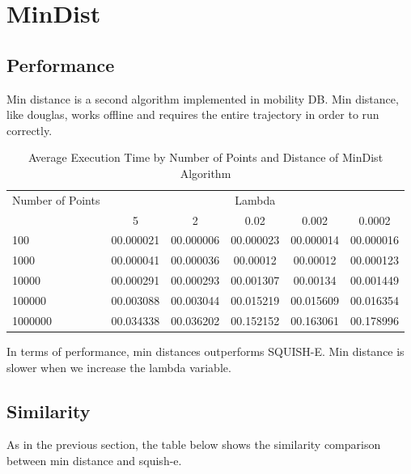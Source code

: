 \section{MinDist}
\subsection{Performance}
Min distance is a second algorithm implemented in mobility DB. Min distance, like douglas, works offline and requires the entire trajectory in order to run correctly. %
\begin{table}[htbp]
    \centering
    \label{tab:execution_time_mindist}
    \begin{tabular}{@{}lccccc@{}}
        \toprule
        Number of Points & \multicolumn{5}{c}{Lambda} \\
        \cmidrule{2-6}
        & 5         & 2       & 0.02        & 0.002       & 0.0002       \\
        \midrule
        100              & 00.000021 & 00.000006 & 00.000023 & 00.000014 & 00.000016 \\
        1000             & 00.000041  & 00.000036 & 00.00012 & 00.00012 & 00.000123 \\
        10000            & 00.000291 & 00.000293 & 00.001307 & 00.00134 & 00.001449 \\
        100000           & 00.003088  & 00.003044  & 00.015219 & 00.015609 & 00.016354 \\
        1000000          & 00.034338 & 00.036202 & 00.152152 & 00.163061 & 00.178996 \\
        \bottomrule
    \end{tabular}
    \caption{Average Execution Time by Number of Points and Distance of MinDist Algorithm}
\end{table}

In terms of performance, min distances outperforms SQUISH-E. Min distance is slower when we increase the lambda variable.

\subsection{Similarity}
As in the previous section, the table below shows the similarity comparison between min distance and squish-e.

